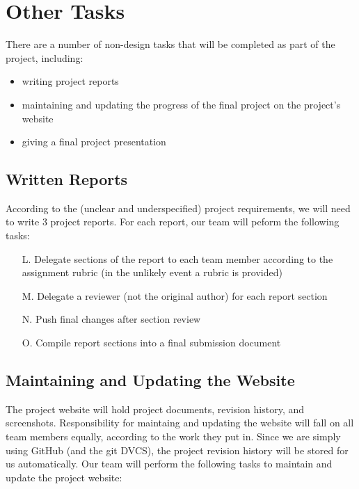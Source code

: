 \chapter{Other Tasks}

There are a number of non-design tasks that will be completed as part of the
project, including:

\begin{itemize}
    \item writing project reports
    \item maintaining and updating the progress of the final project on the project's website
    \item giving a final project presentation
\end{itemize}

\section{Written Reports}
\label{sec:reports}

According to the (unclear and underspecified) project requirements, we will
need to write 3 project reports. For each report, our team will peform the
following tasks:

\begin{itemize}
    \item [L.] \label{task:L} Delegate sections of the report to each team member according
          to the assignment rubric (in the unlikely event a rubric is
          provided)
    \item [M.] \label{task:M} Delegate a reviewer (not the original author) for each report
          section
    \item [N.] \label{task:N} Push final changes after section review
    \item [O.] \label{task:O} Compile report sections into a final submission document
\end{itemize}

\section{Maintaining and Updating the Website}
\label{sec:website}

The project website will hold project documents, revision history, and
screenshots. Responsibility for maintaing and updating the website will fall
on all team members equally, according to the work they put in. Since we
are simply using GitHub (and the git DVCS), the project revision history
will be stored for us automatically. Our team will perform the following
tasks to maintain and update the project website:


